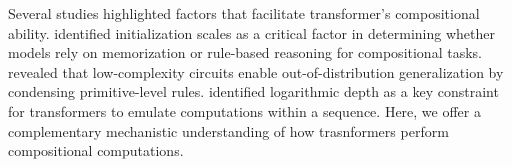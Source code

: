 Several studies highlighted factors that facilitate transformer's compositional ability. \citet{Wang2024-mi} identified initialization scales as a critical factor in determining whether models rely on memorization or rule-based reasoning for compositional tasks. \citet{Zhang2025-id} revealed that low-complexity circuits enable out-of-distribution generalization by condensing primitive-level rules. \citep{Sanford2024-ye} identified logarithmic depth as a key constraint for transformers to emulate computations within a sequence. Here, we offer a complementary mechanistic understanding of how trasnformers perform compositional computations.